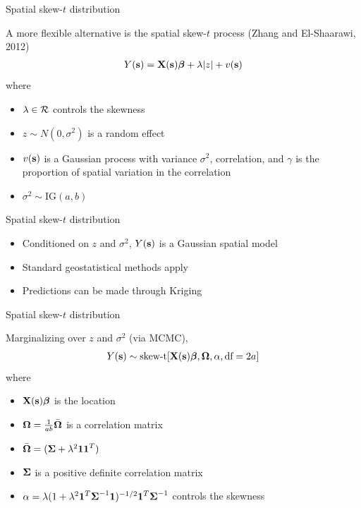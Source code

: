\documentclass{beamer}
\begin{document}
\begin{frame}{Spatial skew-$t$ distribution}
\begin{adjustwidth}{1em}{0em}
  A more flexible alternative is the spatial skew-$t$ process (Zhang and El-Shaarawi, 2012)
  \begin{align*}
    Y(\mbox{\bf s}) = \mbox{\bf X}(\mbox{\bf s})\mbox{\boldmath $\beta$} + \lambda |z| + v(\mbox{\bf s})
  \end{align*}
  where
  \begin{itemize} \setlength{\itemsep}{0.25em}
    \item $\lambda \in {\cal R}$ controls the skewness
    \item $z \sim N(0, \sigma^2)$ is a random effect
    \item $v(\mbox{\bf s})$ is a Gaussian process with variance $\sigma^2$, \Matern correlation, and $\gamma$ is the proportion of spatial variation in the \Matern correlation
    \item $\sigma^2 \sim \text{IG}(a, b)$
  \end{itemize}
\end{adjustwidth}
\end{frame}

\begin{frame}{Spatial skew-$t$ distribution}
  \begin{itemize} \setlength{\itemsep}{1em}
    \item \alert{Conditioned} on $z$ and $\sigma^2$, $Y(\mbox{\bf s})$ is a Gaussian spatial model
    \item Standard geostatistical methods apply
    \item Predictions can be made through Kriging
  \end{itemize}
\end{frame}

\begin{frame}{Spatial skew-$t$ distribution}
\begin{adjustwidth}{1em}{0em}
  \alert{Marginalizing} over $z$ and $\sigma^2$ (via MCMC),
  \begin{align*}
    Y(\mbox{\bf s}) \sim \text{skew-t}[\mbox{\bf X}(\mbox{\bf s}) \mbox{\boldmath $\beta$}, \mbox{\boldmath $\Omega$}, \alpha, \text{df}=2a]
  \end{align*}
  where
  \begin{itemize} \setlength{\itemsep}{0.25em}
    \item $\mbox{\bf X}(\mbox{\bf s}) \mbox{\boldmath $\beta$}$ is the location
    \item $\mbox{\boldmath $\Omega$} = \frac{1}{ab} \bar{\mbox{\boldmath $\Omega$}}$ is a correlation matrix
    \item $\bar{\mbox{\boldmath $\Omega$}} = (\mbox{\boldmath $\Sigma$} + \lambda^2 \mbox{\boldmath $1$} \mbox{\boldmath $1$}^T)$
    \item $\mbox{\boldmath $\Sigma$}$ is a positive definite correlation matrix
    \item $\alpha = \lambda( 1 + \lambda^2 \mbox{\boldmath $1$}^T \mbox{\boldmath $\Sigma$}^{-1} \mbox{\boldmath $1$})^{-1/2} \mbox{\boldmath $1$}^T \mbox{\boldmath $\Sigma$}^{-1}$ controls the skewness
  \end{itemize}
\end{adjustwidth}
\end{frame}
\end{document}
